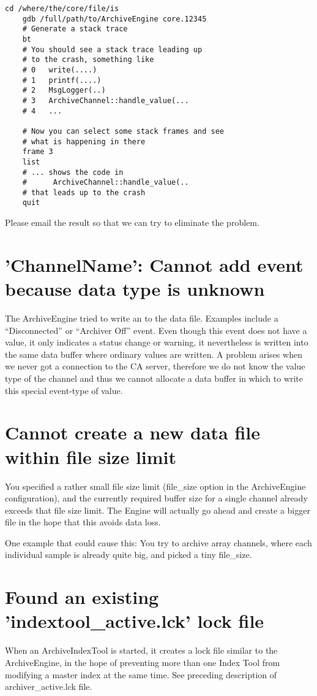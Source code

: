 \begin{lstlisting}[keywordstyle=\sffamily]
    cd /where/the/core/file/is
    gdb /full/path/to/ArchiveEngine core.12345
    # Generate a stack trace
    bt
    # You should see a stack trace leading up
    # to the crash, something like
    # 0   write(....)
    # 1   printf(....)
    # 2   MsgLogger(..)
    # 3   ArchiveChannel::handle_value(...
    # 4   ...

    # Now you can select some stack frames and see
    # what is happening in there
    frame 3
    list
    # ... shows the code in
    #      ArchiveChannel::handle_value(..
    # that leads up to the crash
    quit
\end{lstlisting}

\noindent Please email the result so that we can try to eliminate the
problem.

\section{'ChannelName': Cannot add event because data type is unknown}
The ArchiveEngine tried to write an  to the data
file. Examples include a ``Disconnected'' or ``Archiver Off''
event. Even though this event does not have a value, it only
indicates a status change or warning, it nevertheless is written
into the same data buffer where ordinary values are written.
A problem arises when we never got a connection to the CA
server, therefore we do not know the value type of the channel
and thus we cannot allocate a data buffer in which to write this
special event-type of value.

\section{Cannot create a new data file within file size limit}
You specified a rather small file size limit (file\_size option in the
ArchiveEngine configuration), and the currently required buffer size
for a single channel already exceeds that file size limit.
The Engine will actually go ahead and create a bigger file in the hope
that this avoids data loss.

One example that could cause this: You try to archive array channels,
where each individual sample is already quite big, and picked a tiny
file\_size. 

\section{Found an existing 'indextool\_active.lck' lock file}
When an ArchiveIndexTool is started, it creates a lock file
similar to the ArchiveEngine, in the hope of preventing more than
one Index Tool from modifying a master index at the same time.
See preceding description of archiver\_active.lck file.

